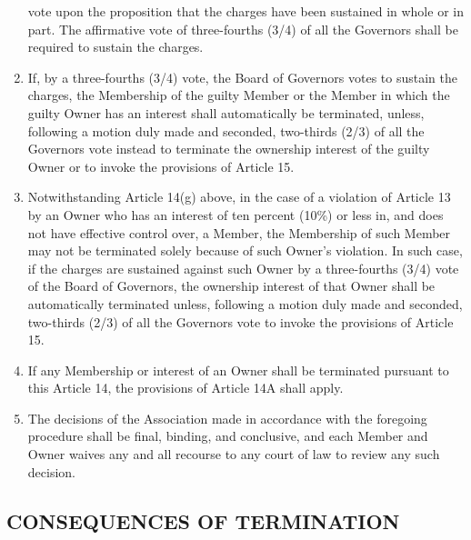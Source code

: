 \documentclass[]{book}
\theoremstyle{definition}
\theoremstyle{definition}
\theoremstyle{definition}
\theoremstyle{remark}
\begin{document}
\begin{enumerate}
  vote upon the proposition that the charges have been sustained in
  whole or in part. The affirmative vote of three-fourths (3/4) of all
  the Governors shall be required to sustain the charges.
\item
  If, by a three-fourths (3/4) vote, the Board of Governors votes to
  sustain the charges, the Membership of the guilty Member or the Member
  in which the guilty Owner has an interest shall automatically be
  terminated, unless, following a motion duly made and seconded,
  two-thirds (2/3) of all the Governors vote instead to terminate the
  ownership interest of the guilty Owner or to invoke the provisions of
  Article 15.
\item
  Notwithstanding Article 14(g) above, in the case of a violation of
  Article 13 by an Owner who has an interest of ten percent (10\%) or
  less in, and does not have effective control over, a Member, the
  Membership of such Member may not be terminated solely because of such
  Owner's violation. In such case, if the charges are sustained against
  such Owner by a three-fourths (3/4) vote of the Board of Governors,
  the ownership interest of that Owner shall be automatically terminated
  unless, following a motion duly made and seconded, two-thirds (2/3) of
  all the Governors vote to invoke the provisions of Article 15.
\item
  If any Membership or interest of an Owner shall be terminated pursuant
  to this Article 14, the provisions of Article 14A shall apply.
\item
  The decisions of the Association made in accordance with the foregoing
  procedure shall be final, binding, and conclusive, and each Member and
  Owner waives any and all recourse to any court of law to review any
  such decision.
\end{enumerate}

\subsection{CONSEQUENCES OF
TERMINATION}\label{consequences-of-termination}
\end{document}
